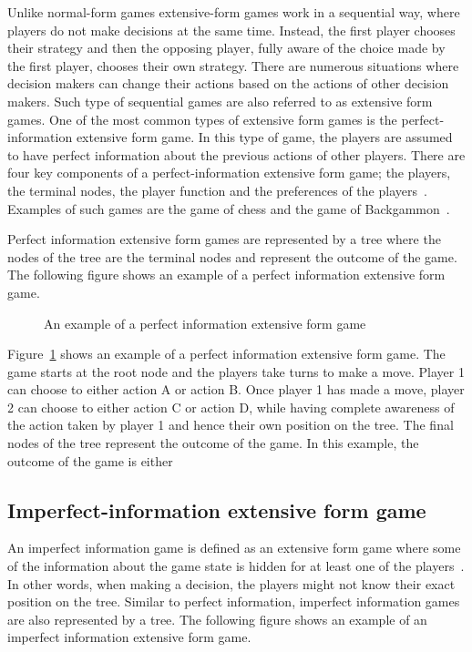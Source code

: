 Unlike normal-form games extensive-form games work in a sequential way, where
players do not make decisions at the same time.
Instead, the first player chooses their strategy and then the opposing player,
fully aware of the choice made by the first player, chooses their own strategy.
There are numerous situations where decision makers can change their actions
based on the actions of other decision makers.
Such type of sequential games are also referred to as extensive form games.
One of the most common types of extensive form games is the perfect-information
extensive form game.
In this type of game, the players are assumed to have perfect information
about the previous actions of other
players.
There are four key components of a perfect-information extensive form game; the
players, the terminal nodes, the player function and the preferences of the
players~\cite{osborne2004_extensive_form_games}.
Examples of such games are the game of chess and the game of
Backgammon~\cite{hart1992games}.

Perfect information extensive form games are represented by a tree where the
nodes of the tree are the terminal nodes and represent the outcome of the
game.
The following figure shows an example of a perfect information extensive form
game.

\begin{figure}[H]
    \centering
    
    \caption{An example of a perfect information extensive form game}
    \label{fig:extensive_form_game}
\end{figure}

Figure~\ref{fig:extensive_form_game} shows an example of a perfect information
extensive form game.
The game starts at the root node and the players take turns to make a move.
Player 1 can choose to either action A or action B.
Once player 1 has made a move, player 2 can choose to either action C or action
D, while having complete awareness of the action taken by player 1 and hence
their own position on the tree.
The final nodes of the tree represent the outcome of the game.
In this example, the outcome of the game is either 

\subsection{Imperfect-information extensive form game}
\label{sec:game_imperfect_information}

An imperfect information game is defined as an extensive form game where some
of the information about the game state is hidden for at least one of the
players~\cite{Berwanger2008}.
In other words, when making a decision, the players might not know their exact
position on the tree.
Similar to perfect information, imperfect information games are also represented
by a tree.
The following figure shows an example of an imperfect information extensive
form game.

